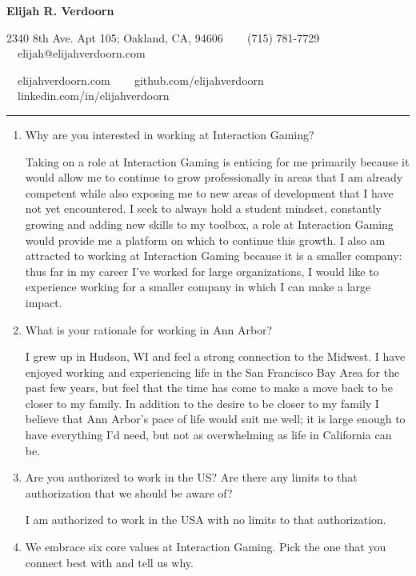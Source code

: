 \documentclass[9pt,letterpaper]{article}
\begin{document}
\begin{center}
{\LARGE \textbf{Elijah R. Verdoorn}}

2340 8th Ave. Apt 105; Oakland, CA, 94606 \ \textbullet
\ \ (715) 781-7729\ \ \textbullet
\ \ elijah@elijahverdoorn.com

\ \ elijahverdoorn.com \ \textbullet
\ \ github.com/elijahverdoorn \ \textbullet
\ \ linkedin.com/in/elijahverdoorn
\end{center}

\hrule
\vspace{1em}

\begin{enumerate}
	\item Why are you interested in working at Interaction Gaming?

		Taking on a role at Interaction Gaming is enticing for me primarily because it would allow me to continue to grow professionally in areas that I am already competent while also exposing me to new areas of development that I have not yet encountered. I seek to always hold a student mindset, constantly growing and adding new skills to my toolbox, a role at Interaction Gaming would provide me a platform on which to continue this growth. I also am attracted to working at Interaction Gaming because it is a smaller company: thus far in my career I've worked for large organizations, I would like to experience working for a smaller company in which I can make a large impact.

	\item What is your rationale for working in Ann Arbor?

		I grew up in Hudson, WI and feel a strong connection to the Midwest. I have enjoyed working and experiencing life in the San Francisco Bay Area for the past few years, but feel that the time has come to make a move back to be closer to my family. In addition to the desire to be closer to my family I believe that Ann Arbor's pace of life would suit me well; it is large enough to have everything I'd need, but not as overwhelming as life in California can be.

	\item Are you authorized to work in the US? Are there any limits to that authorization that we should be aware of?

		I am authorized to work in the USA with no limits to that authorization.

	\item We embrace six core values at Interaction Gaming. Pick the one that you connect best with and tell us why.


\end{enumerate}
\end{document}
